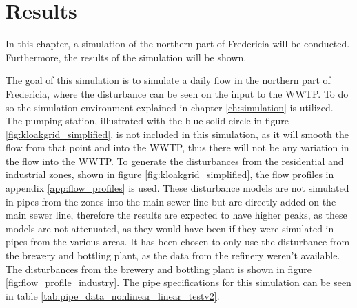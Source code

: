 \chapter{Results}\label{ch:results}
In this chapter, a simulation of the northern part of Fredericia will be conducted. Furthermore, the results of the simulation will be shown.

The goal of this simulation is to simulate a daily flow in the northern part of Fredericia, where the disturbance can be seen on the input to the WWTP. To do so the simulation environment explained in chapter \ref{ch:simulation} is utilized. The pumping station, illustrated with the blue solid circle in figure \ref{fig:kloakgrid_simplified}, is not included in this simulation, as it will smooth the flow from that point and into the WWTP, thus there will not be any variation in the flow into the WWTP. To generate the disturbances from the residential and industrial zones, shown in figure \ref{fig:kloakgrid_simplified}, the flow profiles in appendix \ref{app:flow_profiles} is used. These disturbance models are not simulated in pipes from the zones into the main sewer line but are directly added on the main sewer line, therefore the results are expected to have higher peaks, as these models are not attenuated, as they would have been if they were simulated in pipes from the various areas. It has been chosen to only use the disturbance from the brewery and bottling plant, as the data from the refinery weren't available. The disturbances from the brewery and bottling plant is shown in figure \ref{fig:flow_profile_industry}. The pipe specifications for this simulation can be seen in table \ref{tab:pipe_data_nonlinear_linear_testv2}.  
